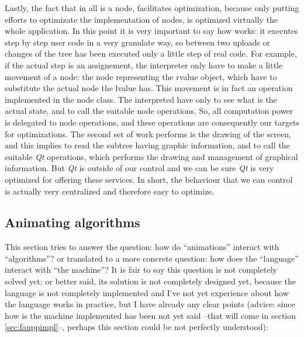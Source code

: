 \documentclass{article}
\begin{document}
Lastly, the fact that in \fav all is a node, facilitates optimization, because
only putting efforts to optimizate the implementation of nodes, is optimized
virtually the whole application. In this point it is very important to say how
\fav works: it executes step by step user code in a very granulate way, so
between two uploads or changes of the tree has been executed only a little step
of real code. For example, if the actual step is an assignement, the interpreter
only have to make a little movement of a node: the node representing the rvalue
object, which have to substitute the actual node the lvalue has. This movement
is in fact an operation implemented in the node class. The interpreted have only
to see what is the actual state, and to call the suitable node operations. So,
all computation power is delegated to node operations, and these operations are
consequently our targets for optimizations. The second set of work \fav performs
is the drawing of the screen, and this implies to read the subtree having
graphic information, and to call the suitable \textit{Qt} operations, which
performs the drawing and management of graphical information. But \textit{Qt} is
outside of our control and we can be sure \textit{Qt} is very optimized for
offering these services. In short, the behaviour that we can control is actually
very centralized and therefore easy to optimize.

\subsection{Animating algorithms}
This section tries to answer the question: how do ``animations'' interact with
``algorithms''? or translated to a more concrete question: how does the
``language'' interact with ``the machine''? It is fair to say this question is
not completely solved yet; or better said, its solution is not completely
designed yet, because the language is not completely implemented and I've not
yet experience about how the language works in practice, but I have already any
clear points (advice: since how is the machine implemented has been not yet said
\---that will come in section \ref{sec:fauppimpl}\---, perhaps this section
could be not perfectly understood):
\end{document}
